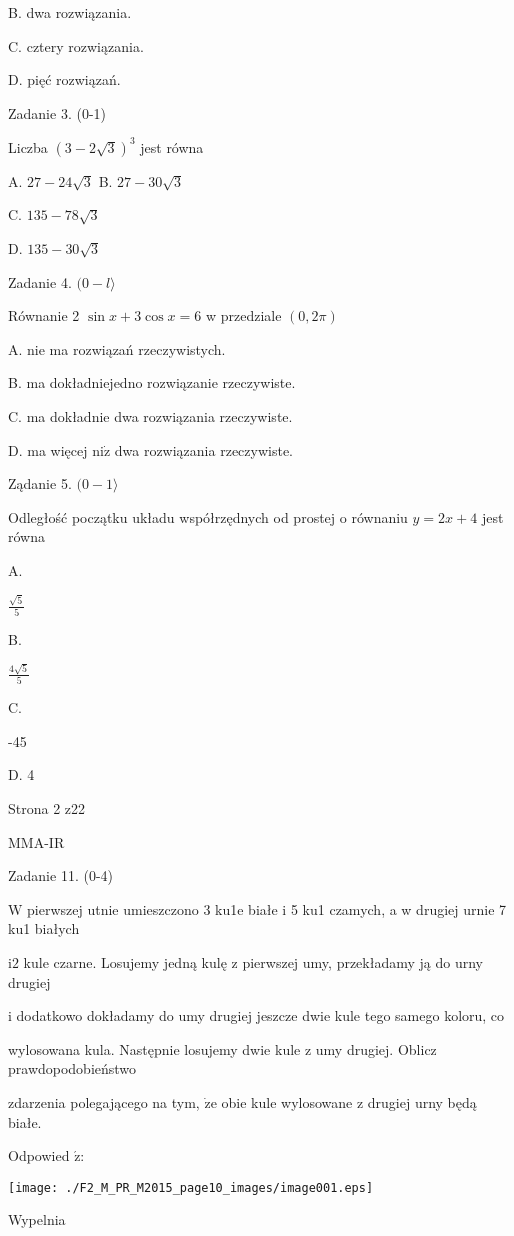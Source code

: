 \documentclass[a4paper,12pt]{article}
\begin{document}
B. dwa rozwiązania.

C. cztery rozwiązania.

D. pięć rozwiązań.

Zadanie 3. (0-1)

Liczba $(3-2\sqrt{3})^{3}$ jest równa

A. $27-24\sqrt{3}$ B. $27-30\sqrt{3}$

C. $135-78\sqrt{3}$

D. $135-30\sqrt{3}$

Zadanie 4. $(0-l\rangle$

Równanie 2 $\sin x+3\cos x=6$ w przedziale $(0,2\pi)$

A. nie ma rozwiązań rzeczywistych.

B. ma dokładniejedno rozwiązanie rzeczywiste.

C. ma dokładnie dwa rozwiązania rzeczywiste.

D. ma więcej $\mathrm{n}\mathrm{i}\dot{\mathrm{z}}$ dwa rozwiązania rzeczywiste.

Ządanie 5. $(0-1\rangle$

Odległość początku układu współrzędnych od prostej o równaniu $y=2x+4$ jest równa

A.

$\displaystyle \frac{\sqrt{5}}{5}$

B.

$\displaystyle \frac{4\sqrt{5}}{5}$

C.

-45

D. 4

Strona 2 z22

MMA-IR





Zadanie 11. (0-4)

$\mathrm{W}$ pierwszej utnie umieszczono 3 ku1e białe i 5 ku1 czamych, a w drugiej urnie 7 ku1 białych

$\mathrm{i}2$ kule czarne. Losujemy jedną kulę z pierwszej umy, przekładamy ją do urny drugiej

i dodatkowo dokładamy do umy drugiej jeszcze dwie kule tego samego koloru, co

wylosowana kula. Następnie losujemy dwie kule z umy drugiej. Oblicz prawdopodobieństwo

zdarzenia polegającego na tym, $\dot{\mathrm{z}}\mathrm{e}$ obie kule wylosowane z drugiej urny będą białe.

Odpowied $\acute{\mathrm{z}}$:
\begin{center}
\texttt{[image: ./F2\_M\_PR\_M2015\_page10\_images/image001.eps]}
\end{center}
Wypelnia
\end{document}
